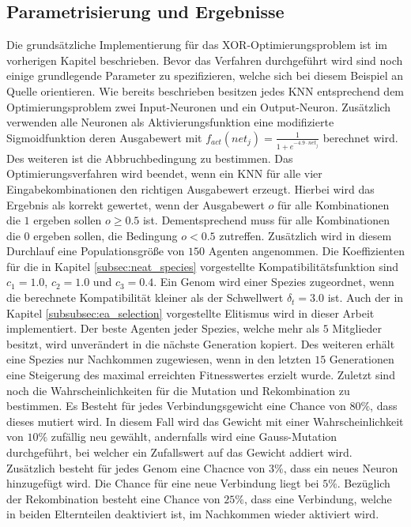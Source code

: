 \subsection{Parametrisierung und Ergebnisse}
Die grundsätzliche Implementierung für das XOR-Optimierungsproblem ist im vorherigen Kapitel beschrieben. Bevor das Verfahren durchgeführt wird sind noch einige grundlegende Parameter zu spezifizieren, welche sich bei diesem Beispiel an Quelle \cite{stanley2002evolving} orientieren. Wie bereits beschrieben besitzen jedes \ac{KNN} entsprechend dem Optimierungsproblem zwei Input-Neuronen und ein Output-Neuron. Zusätzlich verwenden alle Neuronen als Aktivierungsfunktion eine modifizierte Sigmoidfunktion deren Ausgabewert mit $f_{act}(net_j)=\frac{1}{1+e^{-4.9\cdot net_j}}$ berechnet wird. Des weiteren ist die Abbruchbedingung zu bestimmen. Das Optimierungsverfahren wird beendet, wenn ein \ac{KNN} für alle vier Eingabekombinationen den richtigen Ausgabewert erzeugt. Hierbei wird das Ergebnis als korrekt gewertet, wenn der Ausgabewert $o$ für alle Kombinationen die $1$ ergeben sollen $o \geq 0.5$ ist. Dementsprechend muss für alle Kombinationen die $0$ ergeben sollen, die Bedingung $o < 0.5$ zutreffen. Zusätzlich wird in diesem Durchlauf eine Populationsgröße von $150$ Agenten angenommen. Die Koeffizienten für die in Kapitel \ref{subsec:neat_species} vorgestellte Kompatibilitätsfunktion sind $c_1=1.0$, $c_2=1.0$ und $c_3=0.4$. Ein Genom wird einer Spezies zugeordnet, wenn die berechnete Kompatibilität kleiner als der Schwellwert $\delta_t=3.0$ ist. Auch der in Kapitel \ref{subsubsec:ea_selection} vorgestellte Elitismus wird in dieser Arbeit implementiert. Der beste Agenten jeder Spezies, welche mehr als $5$ Mitglieder besitzt, wird unverändert in die nächste Generation kopiert. Des weiteren erhält eine Spezies nur Nachkommen zugewiesen, wenn in den letzten $15$ Generationen eine Steigerung des maximal erreichten Fitnesswertes erzielt wurde. Zuletzt sind noch die Wahrscheinlichkeiten für die Mutation und Rekombination zu bestimmen. Es Besteht für jedes Verbindungsgewicht eine Chance von $80\%$, dass dieses mutiert wird. In diesem Fall wird das Gewicht mit einer Wahrscheinlichkeit von $10\%$ zufällig neu gewählt, andernfalls wird eine Gauss-Mutation durchgeführt, bei welcher ein Zufallswert auf das Gewicht addiert wird. Zusätzlich besteht für jedes Genom eine Chacnce von $3\%$, dass ein neues Neuron hinzugefügt wird. Die Chance für eine neue Verbindung liegt bei  $5\%$. Bezüglich der Rekombination besteht eine Chance von $25\%$, dass eine Verbindung, welche in beiden Elternteilen deaktiviert ist, im Nachkommen wieder aktiviert wird. 
